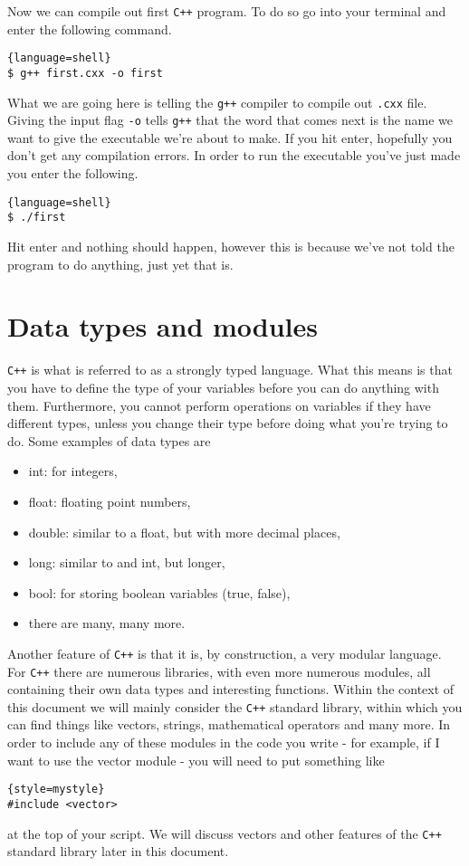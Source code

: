Now we can compile out first \texttt{C++} program.
To do so go into your terminal and enter the following command.
\begin{lstlisting}{language=shell}
$ g++ first.cxx -o first
\end{lstlisting}
What we are going here is telling the \texttt{g++} compiler to compile out \texttt{.cxx} file.
Giving the input flag \texttt{-o} tells \texttt{g++} that the word that comes next is the name we want to give the executable we're about to make.  
If you hit enter, hopefully you don't get any compilation errors. 
In order to run the executable you've just made you enter the following.
\begin{lstlisting}{language=shell}
$ ./first
\end{lstlisting}
Hit enter and nothing should happen, however this is because we've not told the program to do anything, just yet that is.

\section{Data types and modules}
\texttt{C++} is what is referred to as a strongly typed language. 
What this means is that you have to define the type of your variables before you can do anything with them.
Furthermore, you cannot perform operations on variables if they have different types, unless you change their type before doing what you're trying to do.
Some examples of data types are
\begin{itemize}
\item int: for integers,
\item float: floating point numbers,
\item double: similar to a float, but with more decimal places,
\item long: similar to and int, but longer,
\item bool: for storing boolean variables (true, false),
\item there are many, many more.
\end{itemize}

Another feature of \texttt{C++}  is that it is, by construction, a very modular language.
For \texttt{C++} there are numerous libraries, with even more numerous modules, all containing their own data types and interesting functions.
Within the context of this document we will mainly consider the \texttt{C++} standard library, within which you can find things like vectors, strings, mathematical operators and many more. 
In order to include any of these modules in the code you write - for example, if I want to use the vector module - you will need to put something like
\begin{lstlisting}{style=mystyle}
#include <vector>
\end{lstlisting}
at the top of your script.
We will discuss vectors and other features of the \texttt{C++}  standard library later in this document.

